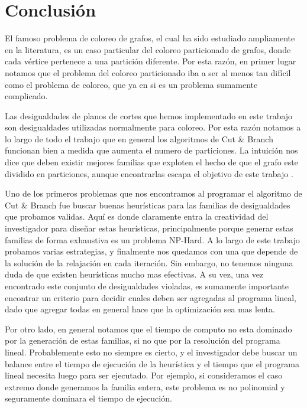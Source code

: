 \section{Conclusión}

El famoso problema de coloreo de grafos, el cual ha sido estudiado ampliamente en la literatura, es un caso particular del coloreo particionado de grafos, donde cada vértice pertenece a una partición diferente. Por esta razón, en primer lugar notamos que el problema del coloreo particionado iba a ser al menos tan difícil como el problema de coloreo, que ya en si es un problema sumamente complicado.

Las desigualdades de planos de cortes que hemos implementado en este trabajo son desigualdades utilizadas normalmente para coloreo. Por esta razón notamos a lo largo de todo el trabajo que en general los algoritmos de Cut \& Branch funcionan bien a medida que aumenta el numero de particiones. La intuición nos dice que deben existir mejores familias que exploten el hecho de que el grafo este dividido en particiones, aunque encontrarlas escapa el objetivo de este trabajo \cite{coloring}.

Uno de los primeros problemas que nos encontramos al programar el algoritmo de Cut \& Branch fue buscar buenas heurísticas para las familias de desigualdades que probamos validas. Aquí es donde claramente entra la creatividad del investigador para diseñar estas heurísticas, principalmente porque generar estas familias de forma exhaustiva es un problema NP-Hard. A lo largo de este trabajo probamos varias estrategias, y finalmente nos quedamos con una que depende de la solución de la relajación en cada iteración. Sin embargo, no tenemos ninguna duda de que existen heurísticas mucho mas efectivas. A su vez, una vez encontrado este conjunto de desigualdades violadas, es sumamente importante encontrar un criterio para decidir cuales deben ser agregadas al programa lineal, dado que agregar todas en general hace que la optimización sea mas lenta.

Por otro lado, en general notamos que el tiempo de computo no esta dominado por la generación de estas familias, si no que por la resolución del programa lineal. Probablemente esto no siempre es cierto, y el investigador debe buscar un balance entre el tiempo de ejecución de la heurística y el tiempo que el programa lineal necesita luego para ser ejecutado. Por ejemplo, si consideramos el caso extremo donde generamos la familia entera, este problema es no polinomial y seguramente dominara el tiempo de ejecución.

